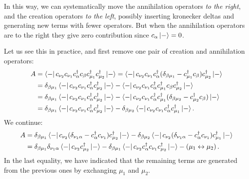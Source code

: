 \documentclass{report}
\theoremstyle{plain}
\theoremstyle{definition}
\begin{document}
In this way, we can systematically move the annihilation operators
\emph{to the right}, and the creation operators \emph{to the
  left}, possibly inserting kronecker deltas and generating new terms
with fewer operators. But when the annihilation operators are to the right they
give zero contribution since $c_\alpha\ket{-}= 0$.

Let us see this in practice, and first remove one pair of creation and
annihilation operators:
\begin{equation}
  \begin{split}
    A &= \bra{-}c_{\nu_2} c_{\nu_1} c^\dag_\alpha c_\beta c^\dag_{\mu_1}
    c^\dag_{\mu_2} \ket{-} = \bra{-}c_{\nu_2} c_{\nu_1} c^\dag_\alpha
    (\delta_{\beta\mu_1} - c^\dag_{\mu_1} c_\beta) c^\dag_{\mu_2}
    \ket{-} \\
    & = \delta_{\beta\mu_1}\bra{-}c_{\nu_2} c_{\nu_1} c^\dag_\alpha
    c^\dag_{\mu_2} \ket{-} - \bra{-}c_{\nu_2} c_{\nu_1} c^\dag_\alpha
    c^\dag_{\mu_1} c_\beta c^\dag_{\mu_2} \ket{-} \\
    & = \delta_{\beta\mu_1}\bra{-}c_{\nu_2} c_{\nu_1} c^\dag_\alpha
    c^\dag_{\mu_2} \ket{-} - \bra{-}c_{\nu_2} c_{\nu_1} c^\dag_\alpha
    c^\dag_{\mu_1} (\delta_{\beta\mu_2} - c^\dag_{\mu_2} c_\beta)
    \ket{-} \\
    & = \delta_{\beta\mu_1}\bra{-}c_{\nu_2} c_{\nu_1} c^\dag_\alpha
    c^\dag_{\mu_2} \ket{-} - \delta_{\beta\mu_2}\bra{-}c_{\nu_2} c_{\nu_1} c^\dag_\alpha
    c^\dag_{\mu_1} \ket{-}.
  \end{split}
\end{equation}
We continue:
\begin{equation}
  \begin{split}
    A &= \delta_{\beta\mu_1} \bra{-} c_{\nu_2}(\delta_{\nu_1\alpha} -
    c^\dag_\alpha c_{\nu_1}) c^\dag_{\mu_2}\ket{-} -
\delta_{\beta\mu_2} \bra{-} c_{\nu_2}(\delta_{\nu_1\alpha} -
    c^\dag_\alpha c_{\nu_1}) c^\dag_{\mu_1}\ket{-} \\
     &= \delta_{\beta\mu_1}\delta_{\nu_1\alpha}\bra{-}c_{\nu_2}
     c^\dag_{\mu_2}\ket{-} - \delta_{\beta\mu_1}\bra{-}c_{\nu_2}
       c^\dag_\alpha c_{\nu_1} c^\dag_{\mu_2}\ket{-} - \left( \mu_1
         \leftrightarrow \mu_2\right) .
  \end{split}
\end{equation}
In the last equality, we have indicated that the remaining terms are
generated from the previous ones by exchanging $\mu_1$ and $\mu_2$.
\end{document}
